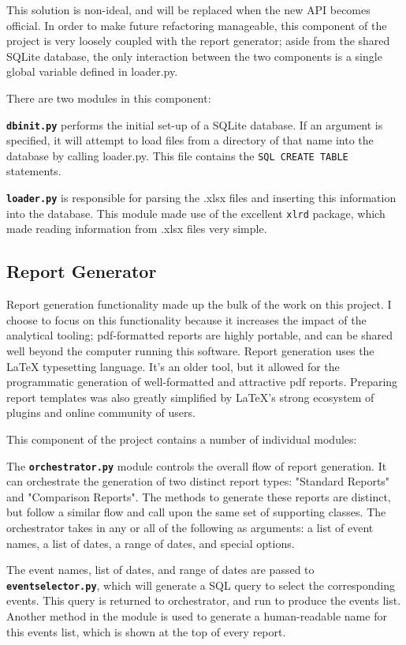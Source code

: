\documentclass[12pt]{article}
\begin{document}
This solution is non-ideal, and will be replaced when the new API becomes official.
In order to make future refactoring manageable, this component of the project is very loosely coupled with the report generator; aside from the shared SQLite database, the only interaction between the two components is a single global variable defined in loader.py.

There are two modules in this component:

\texttt{\textbf{dbinit.py}} performs the initial set-up of a SQLite database. 
If an argument is specified, it will attempt to load files from a directory of that name into the database by calling loader.py.
This file contains the \texttt{SQL CREATE TABLE} statements.

\texttt{\textbf{loader.py}} is responsible for parsing the .xlsx files and inserting this information into the database.
This module made use of the excellent \texttt{xlrd} package, which made reading information from .xlsx files very simple.

\subsection*{Report Generator}
Report generation functionality made up the bulk of the work on this project.
I choose to focus on this functionality because it increases the impact of the analytical tooling; pdf-formatted reports are highly portable, and can be shared well beyond the computer running this software.
Report generation uses the LaTeX typesetting language.
It's an older tool, but it allowed for the programmatic generation of well-formatted and attractive pdf reports.
Preparing report templates was also greatly simplified by LaTeX's strong ecosystem of plugins and online community of users.

This component of the project contains a number of individual modules:

The \texttt{\textbf{orchestrator.py}} module controls the overall flow of report generation.
It can orchestrate the generation of two distinct report types: "Standard Reports" and "Comparison Reports".
The methods to generate these reports are distinct, but follow a similar flow and call upon the same set of supporting classes.
The orchestrator takes in any or all of the following as arguments: a list of event names, a list of dates, a range of dates, and special options.

The event names, list of dates, and range of dates are passed to \texttt{\textbf{eventselector.py}}, which will generate a SQL query to select the corresponding events.
This query is returned to orchestrator, and run to produce the events list.
Another method in the module is used to generate a human-readable name for this events list, which is shown at the top of every report.
\end{document}

